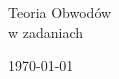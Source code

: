 \thispagestyle{empty}
\begin{titlepage}
  \begin{center}
    \baselineskip=100pt
    {\fontsize{100}{120}\selectfont  Teoria Obwodów} \\[1em] {\fontsize{80}{100}\selectfont w zadaniach}
    \baselineskip=40pt%
     
    \bookauthors
    
    \vfill
    
    {\large \today }
    
  \end{center}
\end{titlepage}
\cleardoublepage
